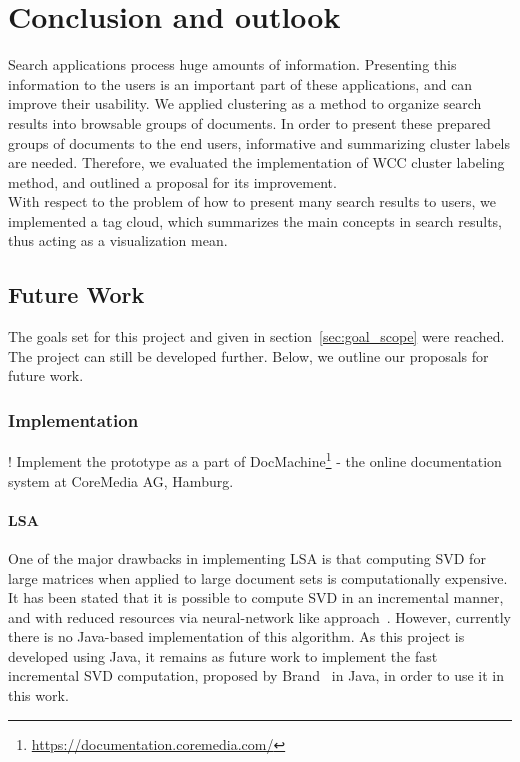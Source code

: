 \chapter{Conclusion and outlook}
\label{sec:conclusion}

Search applications process huge amounts of information. Presenting this information to the users is an important part of these applications, and can improve their usability. We applied clustering as a method to organize search results into browsable groups of documents. In order to present these prepared groups of documents to the end users, informative and summarizing cluster labels are needed. Therefore, we evaluated the implementation of \gls{WCC} cluster labeling method, and outlined a proposal for its improvement. \\

With respect to the problem of how to present many search results to users, we implemented a tag cloud, which summarizes the main concepts in search results, thus acting as a visualization mean. 


\section{Future Work}
The goals set for this project and given in section~\ref{sec:goal_scope} were reached. The project can still be developed further. Below, we outline our proposals for future work. \\

\subsection{Implementation}

! Implement the prototype as a part of DocMachine\footnote{\url{https://documentation.coremedia.com/}} - the online documentation system at CoreMedia AG, Hamburg.

\subsubsection{LSA}
One of the major drawbacks in implementing \gls{LSA} is that computing \gls{SVD} for large matrices when applied to large document sets is computationally expensive. It has been stated that it is possible to compute \gls{SVD} in an incremental manner, and with reduced resources via neural-network like approach~\cite{brand06}. However, currently there is no Java-based implementation of this algorithm. As this project is developed using Java, it remains as future work to implement the fast incremental \gls{SVD} computation, proposed by Brand~\cite{brand06} in Java, in order to use it in this work. \\

